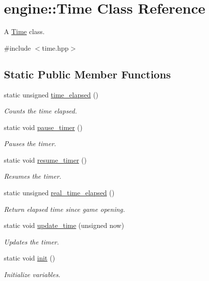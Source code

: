 \hypertarget{classengine_1_1_time}{}\section{engine\+:\+:Time Class Reference}
\label{classengine_1_1_time}


A \hyperlink{classengine_1_1_time}{Time} class.  




{\ttfamily \#include $<$time.\+hpp$>$}

\subsection*{Static Public Member Functions}
\begin{DoxyCompactItemize}
\item 
static unsigned \hyperlink{classengine_1_1_time_a34c6353509709b70415bef938531eb92}{time\+\_\+elapsed} ()
\begin{DoxyCompactList}\small\item\em Counts the time elapsed. \end{DoxyCompactList}\item 
static void \hyperlink{classengine_1_1_time_ac04d488ad4706f86073f0e3aabd19c2a}{pause\+\_\+timer} ()
\begin{DoxyCompactList}\small\item\em Pauses the timer. \end{DoxyCompactList}\item 
static void \hyperlink{classengine_1_1_time_a5d5df71d480f8b3d6dfe5d78870a5b79}{resume\+\_\+timer} ()
\begin{DoxyCompactList}\small\item\em Resumes the timer. \end{DoxyCompactList}\item 
static unsigned \hyperlink{classengine_1_1_time_adf4f08d30fcf9839f534fd9b39cd2dc2}{real\+\_\+time\+\_\+elapsed} ()
\begin{DoxyCompactList}\small\item\em Return elapsed time since game opening. \end{DoxyCompactList}\item 
static void \hyperlink{classengine_1_1_time_a2b04ecff9825dbea41e8efa3300dc147}{update\+\_\+time} (unsigned now)
\begin{DoxyCompactList}\small\item\em Updates the timer. \end{DoxyCompactList}\item 
static void \hyperlink{classengine_1_1_time_ac626e60d7767728dca61c1095cb9678c}{init} ()
\begin{DoxyCompactList}\small\item\em Initialize variables. \end{DoxyCompactList}\end{DoxyCompactItemize}
